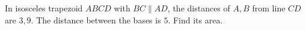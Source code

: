 In isosceles trapezoid $ABCD$ with $BC\parallel AD$, the distances of $A,B$ from line $CD$ are $3,9$. The distance between the bases is $5$. Find its area.
